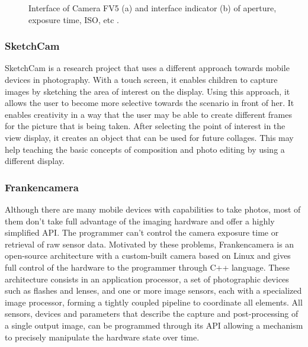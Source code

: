 \begin{figure}[htbp]
        \centering
  \caption{Interface of Camera FV5 (a) and interface indicator (b) of aperture, exposure time, ISO, etc \cite{FV5}.}
  \label{fig:FV5_image}
\end{figure}


\subsubsection{SketchCam}

SketchCam \cite{labrune2007sketchcam} is a research project that uses a different approach towards mobile devices in photography. With a touch screen, it enables children to capture images by sketching the area of interest on the display. 
Using this approach, it allows the user to become more selective towards the scenario in front of her. It enables creativity in a way that the user may be able to create different frames for the picture that is being taken.  After selecting the point of interest in the view display, it creates an object that can be used for future collages. This may help teaching the basic concepts of composition and photo editing by using a different display. 


\subsubsection{Frankencamera}

Although there are many mobile devices with capabilities to take photos, most of them don't take full advantage of the imaging hardware and offer a highly simplified API. The programmer can't control the camera exposure time or retrieval of raw sensor data. Motivated by these problems, Frankencamera \cite{adams2010frankencamera} is an open-source architecture with a custom-built camera based on Linux and gives full control of the hardware to the programmer through C++ language. These architecture consists in an application processor, a set of photographic devices such as flashes and lenses, and one or more image sensors, each with a specialized image processor, forming a tightly coupled pipeline to coordinate all elements. All sensors, devices and parameters that describe the capture and post-processing of a single output image, can be programmed through its API allowing a mechanism to precisely manipulate the hardware state over time.

